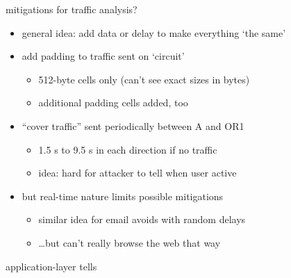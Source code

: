 \begin{frame}{mitigations for traffic analysis?}
    \begin{itemize}
    \item general idea: add data or delay to make everything `the same'
    \item add padding to traffic sent on `circuit'
        \begin{itemize}
        \item 512-byte cells only (can't see exact sizes in bytes)
        \item additional padding cells added, too
        \end{itemize}
    \item ``cover traffic'' sent periodically between A and OR1
        \begin{itemize}
        \item 1.5 s to 9.5 s in each direction if no traffic
        \item idea: hard for attacker to tell when user active
        \end{itemize}
    \item but real-time nature limits possible mitigations
        \begin{itemize}
        \item similar idea for email avoids with random delays
        \item \ldots but can't really browse the web that way
        \end{itemize}
    \end{itemize}
\end{frame}

\begin{frame}{application-layer tells}
\end{frame}
